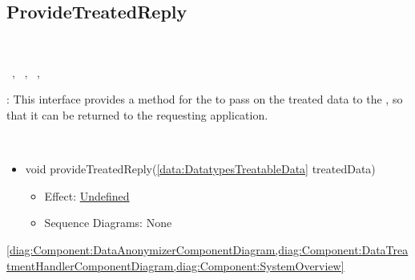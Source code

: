   \subsection{ProvideTreatedReply}\label{int:InterfacesProvideTreatedReply}
    \begin{description}
      \item[Provided by:] \iconcomponent{}~
      \item[Required by:] \iconcomponent{}~, \iconcomponent{}~, \iconcomponent{}~, \iconcomponent{}~ 
           \item[Description]: This interface provides a method for the  to pass on the treated data to the , so that it can be returned to the requesting application.
      \item[Operations:] ~
    \begin{itemize}[noitemsep,nolistsep,leftmargin=-.25cm]
      \item \textsf{void provideTreatedReply(\ref{data:DatatypesTreatableData} treatedData)}
        \begin{itemize}[noitemsep,nolistsep]
           \item Effect: {\colorbox{red!30}{\underline{Undefined}}} 
           \item Sequence Diagrams: None
        \end{itemize}
    \end{itemize}
      \item[Diagrams:] \cref{diag:Component:DataAnonymizerComponentDiagram,diag:Component:DataTreatmentHandlerComponentDiagram,diag:Component:SystemOverview}
    \end{description}

